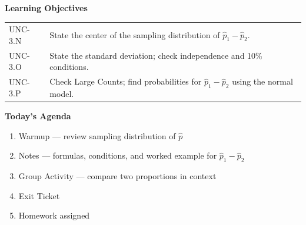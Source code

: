 \documentclass[10pt]{article}
\begin{document}
\namedateperiod

\begin{objectivebox}
\textbf{Learning Objectives}

\medskip
\begin{tabularx}{\linewidth}{@{} l X @{}}
UNC-3.N & State the center of the sampling distribution of $\hat{p}_1 - \hat{p}_2$.\\[4pt]
UNC-3.O & State the standard deviation; check independence and 10\% conditions.\\[4pt]
UNC-3.P & Check Large Counts; find probabilities for $\hat{p}_1 - \hat{p}_2$ using the normal model.\\
\end{tabularx}
\end{objectivebox}

\begin{tocbox}
\textbf{Today's Agenda}
\begin{enumerate}
  \item Warmup — review sampling distribution of $\hat{p}$
  \item Notes — formulas, conditions, and worked example for $\hat{p}_1 - \hat{p}_2$
  \item Group Activity — compare two proportions in context
  \item Exit Ticket
  \item Homework assigned
\end{enumerate}
\end{tocbox}
\end{document}
